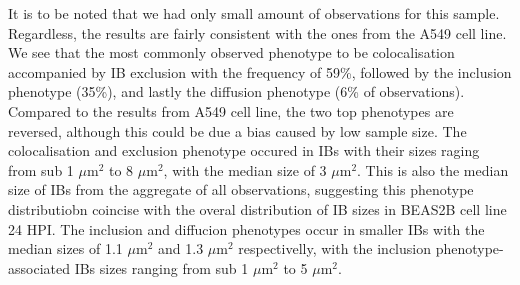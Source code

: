It is to be noted that we had only small amount of observations for this sample. Regardless, the results are fairly consistent with the ones from the A549 cell line. We see that the most commonly observed phenotype to be colocalisation accompanied by IB exclusion with the frequency of 59\%, followed by the inclusion phenotype (35\%), and lastly the diffusion phenotype (6\% of observations). Compared to the results from A549 cell line, the two top phenotypes are reversed, although this could be due a bias caused by low sample size. The colocalisation and exclusion phenotype occured in IBs with their sizes raging from sub 1 \(\mu \mbox{m}^2\) to 8 \(\mu \mbox{m}^2\), with the median size of 3 \(\mu \mbox{m}^2\). This is also the median size of IBs from the aggregate of all observations, suggesting this phenotype distributiobn coincise with the overal distribution of IB sizes in BEAS2B cell line 24 HPI. The inclusion and diffucion phenotypes occur in smaller IBs with the median sizes of 1.1 \(\mu \mbox{m}^2\) and 1.3 \(\mu \mbox{m}^2\) respectivelly, with the inclusion phenotype-associated IBs sizes ranging from sub 1 \(\mu \mbox{m}^2\) to 5 \(\mu \mbox{m}^2\).

